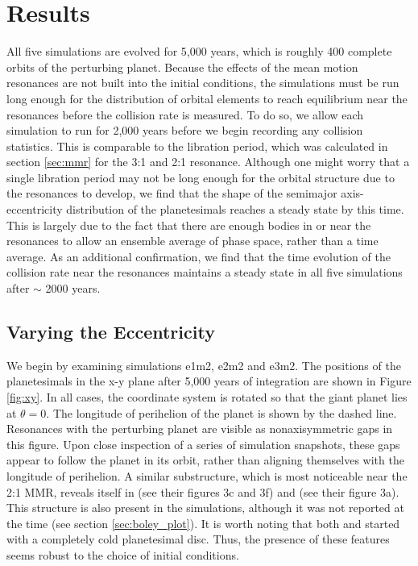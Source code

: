 \section{Results} \label{sec:jup_results}

All five simulations are evolved for 5,000 years, which is roughly 400 complete orbits of the perturbing planet. Because the 
effects of the mean motion resonances are not built into the initial conditions, the simulations must be run long enough for the 
distribution of orbital elements to reach equilibrium near the resonances before the collision rate is measured. To do so, we allow 
each simulation to run for 2,000 years before we begin recording any collision statistics. This is comparable to the libration 
period, which was calculated in section \ref{sec:mmr} for the 3:1 and 2:1 resonance. Although one might worry that a single 
libration period may not be long enough for the orbital structure due to the resonances to develop, we find that the shape of the 
semimajor axis-eccentricity distribution of the planetesimals reaches a steady state by this time. This is largely due to the fact 
that there are enough bodies in or near the resonances to allow an ensemble average of phase space, rather than a time 
average. As an additional confirmation, we find that the time evolution of the collision rate near the resonances maintains a 
steady state in all five simulations after $\sim$ 2000 years.

\subsection{Varying the Eccentricity} \label{sec:vary_ecc}

We begin by examining simulations e1m2, e2m2 and e3m2. The positions of the planetesimals in the x-y plane after 5,000 years 
of integration are shown in Figure \ref{fig:xy}. In all cases, the coordinate system is rotated so that the giant planet lies at $\theta 
= 0$. The longitude of perihelion of the planet is shown by the dashed line. Resonances with the perturbing planet are visible as 
nonaxisymmetric gaps in this figure. Upon close inspection of a series of simulation snapshots, these gaps appear to follow the 
planet in its orbit, rather than aligning themselves with the longitude of perihelion. A similar substructure, which is most 
noticeable near the 2:1 MMR, reveals itself in \cite{richardson00} (see their figures 3c and 3f) and \cite{tabeshian16} (see their 
figure 3a). This structure is also present in the \cite{boley17} simulations, although it was not reported at the time (see section 
\ref{sec:boley_plot}). It is worth noting that both \cite{richardson00} and \cite{boley17} started with a completely cold 
planetesimal disc. Thus, the presence of these features seems robust to the choice of initial conditions.

